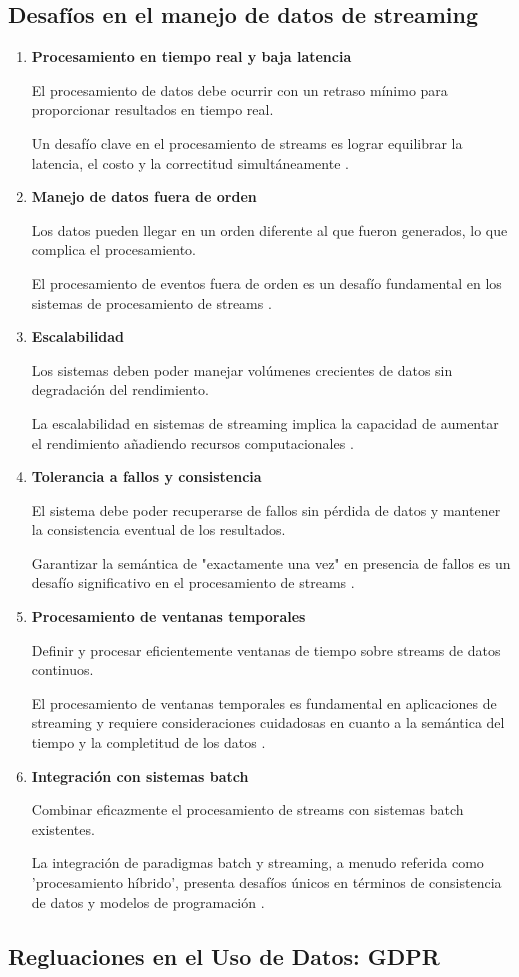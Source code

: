 \subsection{Desafíos en el manejo de datos de streaming}

\begin{enumerate}
    \item \textbf{Procesamiento en tiempo real y baja latencia}
    
    El procesamiento de datos debe ocurrir con un retraso mínimo para proporcionar resultados en tiempo real.
    
    Un desafío clave en el procesamiento de streams es lograr equilibrar la latencia, el costo y la correctitud simultáneamente \parencite{akidau2015dataflow}.

    \item \textbf{Manejo de datos fuera de orden}
    
    Los datos pueden llegar en un orden diferente al que fueron generados, lo que complica el procesamiento.
    
    El procesamiento de eventos fuera de orden es un desafío fundamental en los sistemas de procesamiento de streams \parencite[p.~87]{flink}.

    \item \textbf{Escalabilidad}
    
    Los sistemas deben poder manejar volúmenes crecientes de datos sin degradación del rendimiento.
    
    La escalabilidad en sistemas de streaming implica la capacidad de aumentar el rendimiento añadiendo recursos computacionales \parencite{samurai}.

    \newpage
    \item \textbf{Tolerancia a fallos y consistencia}
    
    El sistema debe poder recuperarse de fallos sin pérdida de datos y mantener la consistencia eventual de los resultados.
    
    Garantizar la semántica de "exactamente una vez" en presencia de fallos es un desafío significativo en el procesamiento de streams \parencite{carbone2015apache}.

    \item \textbf{Procesamiento de ventanas temporales}
    
    Definir y procesar eficientemente ventanas de tiempo sobre streams de datos continuos.
    
    El procesamiento de ventanas temporales es fundamental en aplicaciones de streaming y requiere consideraciones cuidadosas en cuanto a la semántica del tiempo y la completitud de los datos \parencite{akidau2015dataflow}.

    \item \textbf{Integración con sistemas batch}
    
    Combinar eficazmente el procesamiento de streams con sistemas batch existentes.
    
    La integración de paradigmas batch y streaming, a menudo referida como 'procesamiento híbrido', presenta desafíos únicos en términos de consistencia de datos y modelos de programación \parencite{carbone2015apache}.
\end{enumerate}
\newpage



\subsection{Regluaciones en el Uso de Datos: GDPR}
